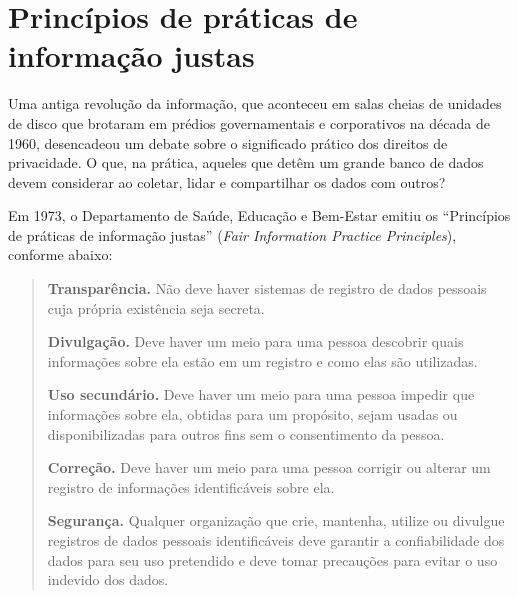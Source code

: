 \documentclass{book}
\newcommand{\ingles}[1]{\textit{#1}}
\begin{document}
\section{Princípios de práticas de informação justas}
\label{cap3:quem-principios}
Uma antiga revolução da informação, que aconteceu em salas cheias de
unidades de disco que brotaram em prédios governamentais e corporativos
na década de 1960, desencadeou um debate sobre o significado prático dos
direitos de privacidade. O que, na prática, aqueles que detêm um grande
banco de dados devem considerar ao coletar, lidar e compartilhar os dados
com outros?

Em 1973, o Departamento de Saúde, Educação e Bem-Estar emitiu os ``Princípios
de práticas de informação justas'' (\ingles{Fair Information Practice Principles}),
conforme abaixo:

\begin{quote}
    \textbf{Transparência.} Não deve haver sistemas de registro de dados pessoais
    cuja própria existência seja secreta.

    \textbf{Divulgação.} Deve haver um meio para uma pessoa descobrir quais
    informações sobre ela estão em um registro e como elas são utilizadas.

    \textbf{Uso secundário.} Deve haver um meio para uma pessoa impedir que
    informações sobre ela, obtidas para um propósito, sejam usadas ou
    disponibilizadas para outros fins sem o consentimento da pessoa.

    \textbf{Correção.} Deve haver um meio para uma pessoa corrigir ou alterar um
    registro de informações identificáveis sobre ela.

    \textbf{Segurança.} Qualquer organização que crie, mantenha, utilize ou divulgue
    registros de dados pessoais identificáveis deve garantir a confiabilidade dos
    dados para seu uso pretendido e deve tomar precauções para evitar o uso indevido
    dos dados.
\end{quote}
\end{document}

